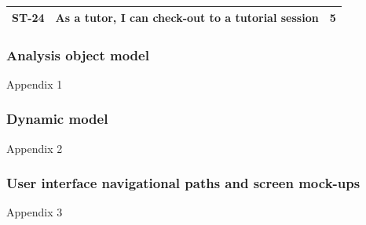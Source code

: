 \documentclass[12pt]{article}
\begin{document}
{{\begin{longtable}{| l | p{10cm}| l |}
			\\ \hline ST-24 & As a tutor, I can  check-out to a tutorial session  & 5 \\ \hline
\end{longtable}
}


\subsubsection{Analysis object model}
Appendix 1



\subsubsection{Dynamic model}
Appendix 2



 \subsubsection{User interface navigational paths and screen mock-ups}
 Appendix 3

}
\end{document}
